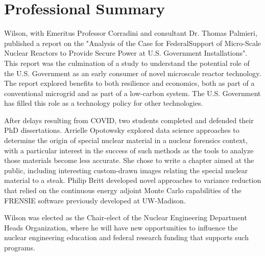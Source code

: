 \section{Professional Summary}

Wilson, with Emeritus Professor Corradini and consultant Dr. Thomas Palmieri,
published a report on the "Analysis of the Case for FederalSupport of
Micro-Scale Nuclear Reactors to Provide Secure Power at U.S. Government
Installations".  This report was the culmination of a study to understand the
potential role of the U.S. Government as an early consumer of novel microscale
reactor technology. The report explored benefits to both resilience and
economics, both as part of a conventional microgrid and as part of a low-carbon
system. The U.S. Government has filled this role as a technology policy for
other technologies.

After delays resulting from COVID, two students completed and defended their PhD
dissertations.  Arrielle Opotowsky explored data science approaches to determine
the origin of special nuclear material in a nuclear forensics context, with a
particular interest in the success of such methods as the tools to analyze those
materials become less accurate.  She chose to write a chapter aimed at the
public, including interesting custom-drawn images relating the special nuclear
material to a steak. Philip Britt developed novel approaches to variance
reduction that relied on the continuous energy adjoint Monte Carlo capabilities
of the FRENSIE software previously developed at UW-Madison.

Wilson was elected as the Chair-elect of the Nuclear Engineering Department
Heads Organization, where he will have new opportunities to influence the
nuclear engineering education and federal research funding that supports such 
programs.